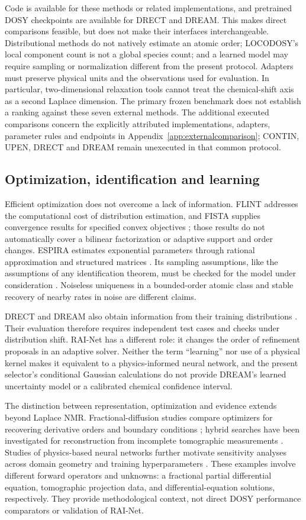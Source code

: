 Code is available for these methods or related implementations, and pretrained DOSY checkpoints are available for DRECT and DREAM. This makes direct comparisons feasible, but does not make their interfaces interchangeable. Distributional methods do not natively estimate an atomic order; LOCODOSY's local component count is not a global species count; and a learned model may require sampling or normalization different from the present protocol. Adapters must preserve physical units and the observations used for evaluation. In particular, two-dimensional relaxation tools \cite{separable2d,upen2d,mupen} cannot treat the chemical-shift axis as a second Laplace dimension. The primary frozen benchmark does not establish a ranking against these seven external methods. The additional executed comparisons concern the explicitly attributed implementations, adapters, parameter rules and endpoints in Appendix~\ref{app:externalcomparison}; CONTIN, UPEN, DRECT and DREAM remain unexecuted in that common protocol.

\subsection{Optimization, identification and learning}
Efficient optimization does not overcome a lack of information. FLINT addresses the computational cost of distribution estimation, and FISTA supplies convergence results for specified convex objectives \cite{flint,fista}; those results do not automatically cover a bilinear factorization or adaptive support and order changes. ESPIRA estimates exponential parameters through rational approximation and structured matrices \cite{espira}. Its sampling assumptions, like the assumptions of any identification theorem, must be checked for the model under consideration \cite{teicher}. Noiseless uniqueness in a bounded-order atomic class and stable recovery of nearby rates in noise are different claims.

DRECT and DREAM also obtain information from their training distributions \cite{drect,dream}. Their evaluation therefore requires independent test cases and checks under distribution shift. RAI-Net has a different role: it changes the order of refinement proposals in an adaptive solver. Neither the term ``learning'' nor use of a physical kernel makes it equivalent to a physics-informed neural network, and the present selector's conditional Gaussian calculations do not provide DREAM's learned uncertainty model or a calibrated chemical confidence interval.

The distinction between representation, optimization and evidence extends beyond Laplace NMR. Fractional-diffusion studies compare optimizers for recovering derivative orders and boundary conditions \cite{fractionalmeta}; hybrid searches have been investigated for reconstruction from incomplete tomographic measurements \cite{hybridct}. Studies of physics-based neural networks further motivate sensitivity analyses across domain geometry and training hyperparameters \cite{pinngeometry}. These examples involve different forward operators and unknowns: a fractional partial differential equation, tomographic projection data, and differential-equation solutions, respectively. They provide methodological context, not direct DOSY performance comparators or validation of RAI-Net.
